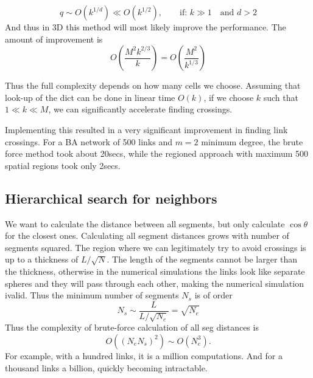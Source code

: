 \documentclass[nofootinbib,preprint,floatfix,titlepage,superscriptaddress]{revtex4} %
\newcommand{\finV}[2]{#2}
\begin{document}
$$ q \sim O(k^{1/d}) \ll O(k^{1/2}), \qquad \mbox{if: } k\gg1 \quad \mbox{and } d> 2$$ 
And thus in 3D this method will most likely improve the performance. The amount of improvement is
$$ O\left( \frac{M^2 k^{2/3} }{ k} \right) = O\left(\frac{M^2}{ k^{1/3}} \right) $$

Thus the full complexity depends on how many cells we choose. Assuming that look-up of the dict can be done in linear time $O(k)$, if we choose $ k$ such that $1\ll k \ll M$, we can significantly accelerate finding crossings.  

Implementing this resulted in a very significant improvement in finding link crossings. For a BA network of 500 links and $m=2$ minimum degree, the brute force method took about 20secs, while the regioned approach with maximum 500 spatial regions took only 2secs. 

\subsection{ Hierarchical search for neighbors}
We want to calculate the distance between all segments, but only calculate $\cos\theta$ for the closest ones. Calculating all segment distances grows with number of segments squared. The region where we can legitimately try to avoid crossings is up to a thickness of $L/\sqrt{N}$. The length of the segments cannot be larger than the thickness, otherwise in the numerical simulations the links look like separate spheres and they will pass through each other, making the numerical simulation ivalid. Thus the minimum number of segments $N_s$ is of order
$$ N_s\sim \frac{L}{L/\sqrt{N_e}} = \sqrt{N_e} $$
Thus the complexity of brute-force calculation of all seg distances is 
$$ O((N_e N_s)^2) \sim O(N_e^3). $$  
For example, with a hundred links, it is a million computations. And for a thousand links a billion, quickly becoming intractable. 

\finV{}{


}

\newpage
\newpage
\setcounter{page}{8}
\end{document}
